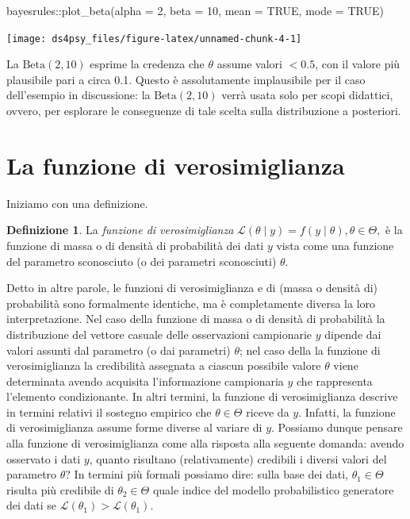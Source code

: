\documentclass[
  11pt,
]{krantz}
\makeatletter
\newenvironment{Shaded}{\begin{snugshade}}{\end{snugshade}}
\newcommand{\AttributeTok}[1]{\textcolor[rgb]{0.61,0.61,0.61}{#1}}
\newcommand{\ConstantTok}[1]{\textcolor[rgb]{0,0,0}{#1}}
\newcommand{\DecValTok}[1]{\textcolor[rgb]{0.06,0.06,0.06}{#1}}
\newcommand{\FunctionTok}[1]{\textcolor[rgb]{0,0,0}{#1}}
\newcommand{\NormalTok}[1]{#1}
\newcommand{\SpecialCharTok}[1]{\textcolor[rgb]{0,0,0}{#1}}
\newenvironment{kframe}{%
\medskip{}
\setlength{\fboxsep}{.8em}
 \def\at@end@of@kframe{}%
 \ifinner\ifhmode%
  \def\at@end@of@kframe{\end{minipage}}%
  \begin{minipage}{\columnwidth}%
 \fi\fi%
 \def\FrameCommand##1{\hskip\@totalleftmargin \hskip-\fboxsep
 \colorbox{shadecolor}{##1}\hskip-\fboxsep
     \hskip-\linewidth \hskip-\@totalleftmargin \hskip\columnwidth}%
 \MakeFramed {\advance\hsize-\width
   \@totalleftmargin\z@ \linewidth\hsize
   \@setminipage}}%
 {\par\unskip\endMakeFramed%
 \at@end@of@kframe}
\renewenvironment{Shaded}{\begin{kframe}}{\end{kframe}}
\theoremstyle{definition}
\newtheorem{definition}{Definizione}[chapter]
\theoremstyle{definition}
\theoremstyle{definition}
\theoremstyle{definition}
\theoremstyle{remark}
\makeatother
\begin{document}
\begin{Shaded}
\begin{Highlighting}[]
\NormalTok{bayesrules}\SpecialCharTok{::}\FunctionTok{plot\_beta}\NormalTok{(}\AttributeTok{alpha =} \DecValTok{2}\NormalTok{, }\AttributeTok{beta =} \DecValTok{10}\NormalTok{, }\AttributeTok{mean =} \ConstantTok{TRUE}\NormalTok{, }\AttributeTok{mode =} \ConstantTok{TRUE}\NormalTok{)}
\end{Highlighting}
\end{Shaded}

\begin{center}\texttt{[image: ds4psy\_files/figure-latex/unnamed-chunk-4-1]} \end{center}

La \(\mbox{Beta}(2, 10)\) esprime la credenza che \(\theta\) assume valori \(< 0.5\), con il valore più plausibile pari a circa 0.1. Questo è assolutamente implausibile per il caso dell'esempio in discussione: la \(\mbox{Beta}(2, 10)\) verrà usata solo per scopi didattici, ovvero, per esplorare le conseguenze di tale scelta sulla distribuzione a posteriori.

\hypertarget{la-funzione-di-verosimiglianza}{%
\section{La funzione di verosimiglianza}\label{la-funzione-di-verosimiglianza}}

Iniziamo con una definizione.

\begin{definition}
La \emph{funzione di verosimiglianza} \(\mathcal{L}(\theta \mid y) = f(y \mid \theta), \theta \in \Theta,\) è la funzione di massa o di densità di probabilità dei dati \(y\) vista come una funzione del parametro sconosciuto (o dei parametri sconosciuti) \(\theta\).
\end{definition}

Detto in altre parole, le funzioni di verosimiglianza e di (massa o densità di) probabilità sono formalmente identiche, ma è completamente diversa la loro interpretazione. Nel caso della funzione di massa o di densità di probabilità la distribuzione del vettore casuale delle osservazioni campionarie \(y\) dipende dai valori assunti dal parametro (o dai parametri) \(\theta\); nel caso della la funzione di verosimiglianza la credibilità assegnata a ciascun possibile valore \(\theta\) viene determinata avendo acquisita l'informazione campionaria \(y\) che rappresenta l'elemento condizionante. In altri termini, la funzione di verosimiglianza descrive in termini relativi il sostegno empirico che \(\theta \in \Theta\) riceve da \(y\). Infatti, la funzione di verosimiglianza assume forme diverse al variare di \(y\). Possiamo dunque pensare alla funzione di verosimiglianza come alla risposta alla seguente domanda: avendo osservato i dati \(y\), quanto risultano (relativamente) credibili i diversi valori del parametro \(\theta\)? In termini più formali possiamo dire: sulla base dei dati, \(\theta_1 \in \Theta\) risulta più credibile di \(\theta_2 \in \Theta\) quale indice del modello probabilistico generatore dei dati se \(\mathcal{L}(\theta_1) > \mathcal{L}(\theta_1)\).
\end{document}
